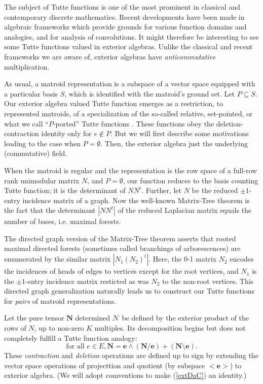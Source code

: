 \documentclass[Unicode]{cedram-alco}
\begin{document}
The subject of Tutte functions is one of the most prominent
in classical and contemporary discrete mathematics. Recent
developments have been made in algebraic frameworks which provide
grounds for various function domains and analogies,
and for analysis of convolutions.
It might therefore be interesting to see some Tutte functions valued
in exterior algebras.  Unlike the classical and recent frameworks
we are aware of, 
exterior algebras \cite{MarcusFDMuAlPt2} have \emph{anticommutative} multiplication.

As usual, a matroid representation is a subspace
of a vector space equipped with a particular basis $S$, which is 
identified with the matroid's ground set.  Let $P \subseteq S$.
Our exterior
algebra valued Tutte function emerges as a restriction, to represented matroids,
of a specialization of
the so-called relative, set-pointed, or what we call ``$P$-ported''
Tutte functions \cite{MR0419272,SetPointedLV,sdcPorted,TutteEx,RelTuttePolyDiaoHetyei}.
These functions obey the deletion-contraction
identity only for $e\not\in P$.  But we will first describe some motivations leading to
the case when $P=\emptyset$.  Then, the exterior algebra just the underlying (commutative)
field.

When the matroid is regular and
the representation is the row space of a full-row rank unimodular matrix $N$, and $P=\emptyset$,
our function reduces to the basis counting Tutte function; it is the determinant
of $N N^t$.
Further, let $N$ be the reduced $\pm 1$-entry incidence matrix of a graph.
Now the well-known Matrix-Tree theorem
is the fact that the determinant $|N N^t|$ of the
reduced Laplacian matrix equals the number of bases, i.e. maximal forests.

The directed graph version of the Matrix-Tree theorem asserts that rooted maximal directed forests
(sometimes called branchings of arborescences) are emumerated by the similar matrix
$|N_1 (N_2)^t|$.  Here, the 0-1 matrix $N_2$ encodes the incidences of heads of edges to
vertices except for the root vertices, and $N_1$ is the $\pm 1$-entry incidence matrix
resticted as was $N_2$ to the non-root vertices.
This directed graph generalization 
naturally leads us to construct our
Tutte functions for \emph{pairs} of matroid representations.    




Let the pure tensor $\mathbf{N}$
determined $\mathcal{N}$ be defined
by the exterior product 
of the rows of $N$, up to non-zero $K$ multiples.  Its 
decomposition begins but does not completely fulfill a Tutte function analogy:
\begin{equation}\label{extDaC}
  \text{for all } e \in E, \mathbf{N} =
  \mathbf{e}\wedge(\mathbf{N}/\mathbf{e}) +
  (\mathbf{N}\setminus \mathbf{e}).
\end{equation}
These \emph{contraction} and \emph{deletion} operations are defined up to sign
by extending the vector space operations of projecttion and quotient
(by subspace $<\mathbf{e}>$) to exterior algebra.  (We will adopt comventions
to make (\ref{extDaC}) an identity.)




\end{document}
